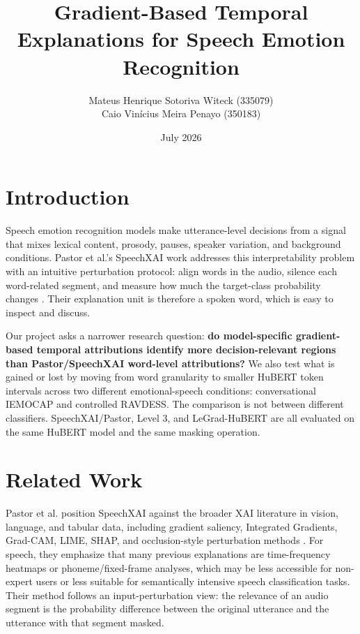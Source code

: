 \documentclass[10pt]{article}
\title{\vspace{-2.0em}Gradient-Based Temporal Explanations for Speech Emotion Recognition}
\author{\small Mateus Henrique Sotoriva Witeck (335079)\\[-0.2em]
\small Caio Vin\'icius Meira Penayo (350183)}
\date{\vspace{-0.7em}July 2026}
\begin{document}
\maketitle
\vspace{-2.0em}

\section{Introduction}

Speech emotion recognition models make utterance-level decisions from a signal that mixes lexical content, prosody, pauses, speaker variation, and background conditions. Pastor et al.'s SpeechXAI work addresses this interpretability problem with an intuitive perturbation protocol: align words in the audio, silence each word-related segment, and measure how much the target-class probability changes \cite{pastor2024speechxai}. Their explanation unit is therefore a spoken word, which is easy to inspect and discuss.

Our project asks a narrower research question: \textbf{do model-specific gradient-based temporal attributions identify more decision-relevant regions than Pastor/SpeechXAI word-level attributions?} We also test what is gained or lost by moving from word granularity to smaller HuBERT token intervals across two different emotional-speech conditions: conversational IEMOCAP and controlled RAVDESS. The comparison is not between different classifiers. SpeechXAI/Pastor, Level 3, and LeGrad-HuBERT are all evaluated on the same HuBERT model and the same masking operation.

\section{Related Work}

Pastor et al. position SpeechXAI against the broader XAI literature in vision, language, and tabular data, including gradient saliency, Integrated Gradients, Grad-CAM, LIME, SHAP, and occlusion-style perturbation methods \cite{pastor2024speechxai}. For speech, they emphasize that many previous explanations are time-frequency heatmaps or phoneme/fixed-frame analyses, which may be less accessible for non-expert users or less suitable for semantically intensive speech classification tasks. Their method follows an input-perturbation view: the relevance of an audio segment is the probability difference between the original utterance and the utterance with that segment masked.
\end{document}
